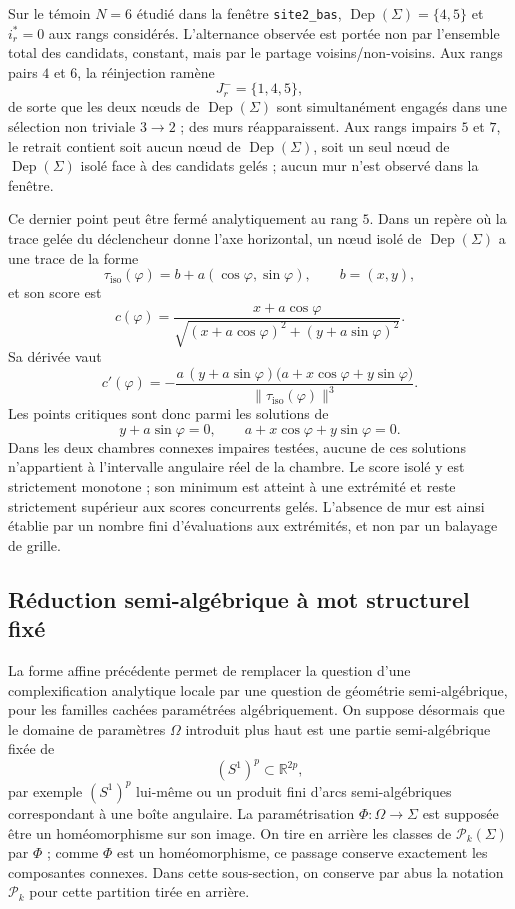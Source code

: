 \documentclass[11pt,a4paper]{article}
\theoremstyle{definition}
\theoremstyle{remark}
\begin{document}
Sur le témoin $N=6$ étudié dans la fenêtre \texttt{site2\_bas}, $\operatorname{Dep}(\Sigma)=\{4,5\}$ et $i_r^*=0$ aux rangs considérés. L'alternance observée est portée non par l'ensemble total des candidats, constant, mais par le partage voisins/non-voisins. Aux rangs pairs $4$ et $6$, la réinjection ramène
\[
 J_r^-=\{1,4,5\},
\]
de sorte que les deux nœuds de $\operatorname{Dep}(\Sigma)$ sont simultanément engagés dans une sélection non triviale $3\to2$ ; des murs réapparaissent. Aux rangs impairs $5$ et $7$, le retrait contient soit aucun nœud de $\operatorname{Dep}(\Sigma)$, soit un seul nœud de $\operatorname{Dep}(\Sigma)$ isolé face à des candidats gelés ; aucun mur n'est observé dans la fenêtre.

Ce dernier point peut être fermé analytiquement au rang $5$. Dans un repère où la trace gelée du déclencheur donne l'axe horizontal, un nœud isolé de $\operatorname{Dep}(\Sigma)$ a une trace de la forme
\[
 \tau_{\mathrm{iso}}(\varphi)=b+a(\cos\varphi,\sin\varphi),
 \qquad b=(x,y),
\]
et son score est
\[
 c(\varphi)
 =\frac{x+a\cos\varphi}
 {\sqrt{(x+a\cos\varphi)^2+(y+a\sin\varphi)^2}}.
\]
Sa dérivée vaut
\[
 \boxed{
 c'(\varphi)
 =-\frac{a\,(y+a\sin\varphi)
 \bigl(a+x\cos\varphi+y\sin\varphi\bigr)}
 {\|\tau_{\mathrm{iso}}(\varphi)\|^3}.}
\]
Les points critiques sont donc parmi les solutions de
\[
 y+a\sin\varphi=0,
 \qquad
 a+x\cos\varphi+y\sin\varphi=0.
\]
Dans les deux chambres connexes impaires testées, aucune de ces solutions n'appartient à l'intervalle angulaire réel de la chambre. Le score isolé y est strictement monotone ; son minimum est atteint à une extrémité et reste strictement supérieur aux scores concurrents gelés. L'absence de mur est ainsi établie par un nombre fini d'évaluations aux extrémités, et non par un balayage de grille.

\subsection{Réduction semi-algébrique à mot structurel fixé}

La forme affine précédente permet de remplacer la question d'une complexification analytique locale par une question de géométrie semi-algébrique, pour les familles cachées paramétrées algébriquement. On suppose désormais que le domaine de paramètres $\Omega$ introduit plus haut est une partie semi-algébrique fixée de
\[
 (S^1)^p\subset\mathbb R^{2p},
\]
par exemple $(S^1)^p$ lui-même ou un produit fini d'arcs semi-algébriques correspondant à une boîte angulaire. La paramétrisation $\Phi:\Omega\to\Sigma$ est supposée être un homéomorphisme sur son image. On tire en arrière les classes de $\mathcal P_k(\Sigma)$ par $\Phi$ ; comme $\Phi$ est un homéomorphisme, ce passage conserve exactement les composantes connexes. Dans cette sous-section, on conserve par abus la notation $\mathcal P_k$ pour cette partition tirée en arrière.
\end{document}

